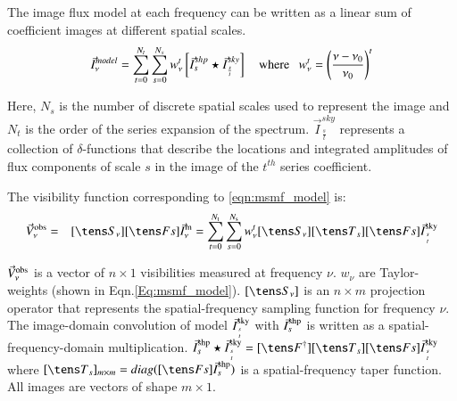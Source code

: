 \documentclass[11pt,a4paper,variablewidth]{article}
\begin{document}
The image flux model at each frequency can be written as a linear sum of  
coefficient images at different spatial scales. 
\begin{equation}
\vec{I}^{model}_{\nu} = \sum_{t=0}^{N_t} \sum_{s=0}^{N_s} {w_{\nu}^t} \left[ \vec{I}^{shp}_s \star \vec{I}^{sky}_\frac{s}{t}\right] ~~~~\mathrm{where}~~~{w_{\nu}^t} = {\left(\frac{\nu-\nu_0}{\nu_0}\right)}^t 
\label{eqn:msmf_model}
\end{equation}

Here, $N_s$ is the number of discrete spatial scales used to represent the image and  
$N_t$ is the order of the series expansion of the spectrum. $\vec{I}^{sky}_\frac{s}{t}$ represents 
a collection of $\delta$-functions that describe the locations
and integrated amplitudes of flux components of scale $s$ in the image of the $t^{th}$ series 
coefficient. 

The visibility function corresponding to \ref{eqn:msmf_model} is:
\begin{eqnarray}
\vec{V}^{\rm obs}_{\nu} &=& [\Sna][\F]\vec{I}^{\rm m}_{\nu}
= \sum_{t=0}^{\Nt } \sum_{s=0}^{\Ns } \wnt [\Sna][\T_s][\F] \vec{I}^{\rm sky}_{s\atop t}
\label{eqn:msmfs_meqn}
\end{eqnarray}

$\vec{V}^{\rm obs}_{\nu}$ is a vector of $n\times 1$ visibilities
measured at frequency $\nu$.
$w_{\nu}$ are Taylor-weights (shown in Eqn.\ref{Eq:msmf_model}).
$[\Sna]$ is an $n\times m$ projection operator that represents the 
spatial-frequency sampling function for frequency $\nu$. 
The image-domain convolution of model $\vec{I}^{\rm sky}_{s\atop t}$ with
 ${\vec{I}}^{\rm shp}_s$ is written as a spatial-frequency-domain multiplication.
$ \vec{I}^{\rm shp}_s \star \vec{I}^{\rm sky}_{s\atop t} = [\Fd][\T_s][\F] \vec{I}^{\rm sky}_{s\atop t}$
where $[\T_s]_{m\times m} = diag([\F] \vec{I}^{\rm shp}_s)$ is a spatial-frequency
taper function.  All images are vectors of shape $m\times 1$.
\end{document}
